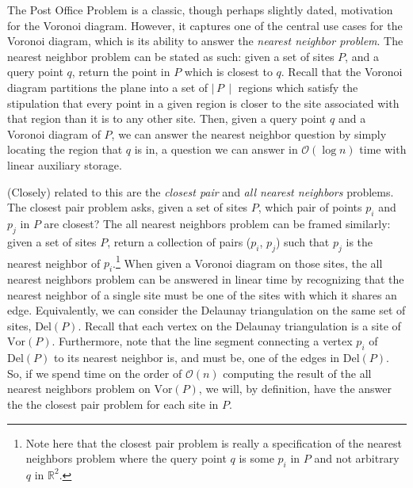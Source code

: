 \documentclass[12pt,twoside]{reedthesis}
\begin{document}
    The Post Office Problem is a classic, though perhaps slightly dated, motivation for the Voronoi diagram. However, it captures one of the central use cases for the Voronoi diagram, which is its ability to answer the \emph{nearest neighbor problem}. The nearest neighbor problem can be stated as such: given a set of sites $P$, and a query point $q$, return the point in $P$ which is closest to $q$. Recall that the Voronoi diagram partitions the plane into a set of $\mid\,P\,\mid$ regions which satisfy the stipulation that every point in a given region is closer to the site associated with that region than it is to any other site. Then, given a query point $q$ and a Voronoi diagram of $P$, we can answer the nearest neighbor question by simply locating the region that $q$ is in, a question we can answer in $\mathcal{O}(\log n)$ time with linear auxiliary storage.\citep[p. 214]{shamos}\par
    
    (Closely) related to this are the \emph{closest pair} and \emph{all nearest neighbors} problems. The closest pair problem asks, given a set of sites $P$, which pair of points $p_{i}$ and $p_{j}$ in $P$ are closest? The all nearest neighbors problem can be framed similarly: given a set of sites $P$, return a collection of pairs ($p_{i}$, $p_{j}$) such that $p_{j}$ is the nearest neighbor of $p_{i}$.\footnote{Note here that the closest pair problem is really a specification of the nearest neighbors problem where the query point $q$ is some $p_{i}$ in $P$ and not arbitrary $q$ in $\mathds{R}^2$.} When given a Voronoi diagram on those sites, the all nearest neighbors problem can be answered in linear time by recognizing that the nearest neighbor of a single site must be one of the sites with which it shares an edge. Equivalently, we can consider the Delaunay triangulation on the same set of sites, $\mbox{Del}(P)$. Recall that each vertex on the Delaunay triangulation is a site of $\mbox{Vor}(P)$. Furthermore, note that the line segment connecting a vertex $p_{i}$ of $\mbox{Del}(P)$ to its nearest neighbor is, and must be, one of the edges in $\mbox{Del}(P)$. So, if we spend time on the order of $\mathcal{O}(n)$ computing the result of the all nearest neighbors problem on $\mbox{Vor}(P)$, we will, by definition, have the answer the the closest pair problem for each site in $P$. 

\end{document}
